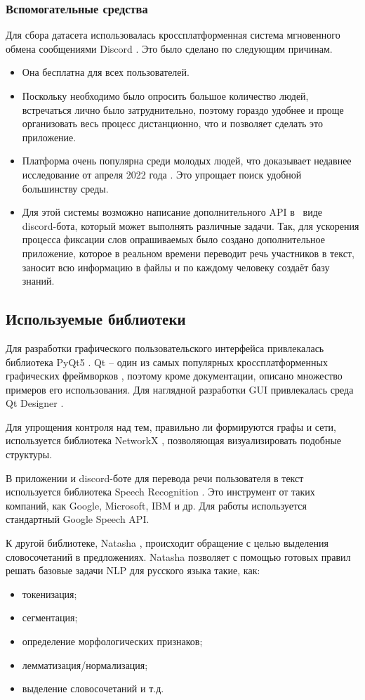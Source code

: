 \subsubsection{Вспомогательные средства}
Для сбора датасета использовалась кроссплатформенная система мгновенного обмена сообщениями Discord \cite{discord}. Это было сделано по следующим причинам.
\begin{itemize}
	\item Она бесплатна для всех пользователей.
	\item Поскольку необходимо было опросить большое количество людей, встречаться лично было затруднительно, поэтому гораздо удобнее и проще организовать весь процесс дистанционно, что и позволяет сделать это приложение.
	\item Платформа очень популярна среди молодых людей, что доказывает недавнее исследование от апреля 2022 года \cite{discordS}. Это упрощает поиск удобной большинству среды. 
	\item Для этой системы возможно написание дополнительного API в \, виде \, discord-бота, который может выполнять различные задачи. Так, для ускорения процесса фиксации слов опрашиваемых было создано дополнительное приложение, которое в реальном времени переводит речь участников в текст, заносит всю информацию в файлы и по каждому человеку создаёт базу знаний.
\end{itemize}

\subsection{Используемые библиотеки}
Для разработки графического пользовательского интерфейса привлекалась библиотека PyQt5 \cite{pyqt5}. Qt -- один из самых популярных кроссплатформенных графических фреймворков \cite{qt}, поэтому кроме документации, описано множество примеров его использования. Для наглядной разработки GUI привлекалась среда Qt Designer \cite{qtdesigner}.

Для упрощения контроля над тем, правильно ли формируются графы и сети, используется библиотека NetworkX \cite{networkx}, позволяющая визуализировать подобные структуры. 

В приложении и discord-боте для перевода речи пользователя в текст используется библиотека Speech Recognition \cite{speech_rec}. Это инструмент от таких компаний, как Google, Microsoft, IBM и др. Для работы используется стандартный Google Speech API.

К другой библиотеке, Natasha \cite{natasha}, происходит обращение с целью выделения словосочетаний в предложениях. Natasha позволяет  с помощью готовых правил решать базовые задачи NLP для русского языка такие, как:
\begin{itemize}
	\item токенизация;
	\item сегментация;
	\item определение морфологических признаков;
	\item лемматизация/нормализация;
	\item выделение словосочетаний и т.д.
\end{itemize}

